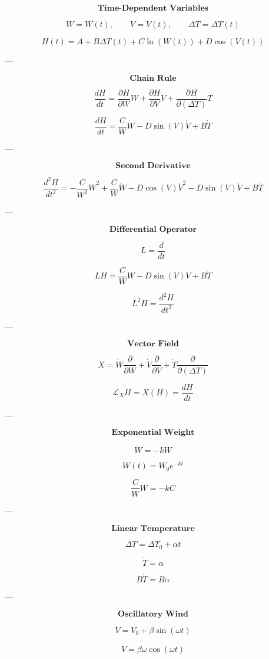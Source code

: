 \documentclass{article}
\begin{document}
\[
\textbf{Time-Dependent Variables}
\]

\[
W=W(t),
\qquad
V=V(t),
\qquad
\Delta T=\Delta T(t)
\]

\[
H(t)
=
A+B\Delta T(t)+C\ln(W(t))+D\cos(V(t))
\]

---

\[
\textbf{Chain Rule}
\]

\[
\frac{dH}{dt}
=
\frac{\partial H}{\partial W}\dot W
+
\frac{\partial H}{\partial V}\dot V
+
\frac{\partial H}{\partial(\Delta T)}\dot T
\]

\[
\boxed{
\frac{dH}{dt}
=
\frac{C}{W}\dot W
-
D\sin(V)\dot V
+
B\dot T
}
\]

---

\[
\textbf{Second Derivative}
\]

\[
\boxed{
\frac{d^2H}{dt^2}
=
-\frac{C}{W^2}\dot W^2
+
\frac{C}{W}\ddot W
-
D\cos(V)\dot V^2
-
D\sin(V)\ddot V
+
B\ddot T
}
\]

---

\[
\textbf{Differential Operator}
\]

\[
L=\frac{d}{dt}
\]

\[
LH
=
\frac{C}{W}\dot W
-
D\sin(V)\dot V
+
B\dot T
\]

\[
L^2H
=
\frac{d^2H}{dt^2}
\]

---

\[
\textbf{Vector Field}
\]

\[
X
=
\dot W\frac{\partial}{\partial W}
+
\dot V\frac{\partial}{\partial V}
+
\dot T\frac{\partial}{\partial(\Delta T)}
\]

\[
\boxed{
\mathcal L_XH
=
X(H)
=
\frac{dH}{dt}
}
\]

---

\[
\textbf{Exponential Weight}
\]

\[
\dot W=-kW
\]

\[
W(t)=W_0e^{-kt}
\]

\[
\frac{C}{W}\dot W
=
-kC
\]

---

\[
\textbf{Linear Temperature}
\]

\[
\Delta T
=
\Delta T_0+\alpha t
\]

\[
\dot T=\alpha
\]

\[
B\dot T
=
B\alpha
\]

---

\[
\textbf{Oscillatory Wind}
\]

\[
V
=
V_0+\beta\sin(\omega t)
\]

\[
\dot V
=
\beta\omega\cos(\omega t)
\]
\end{document}
